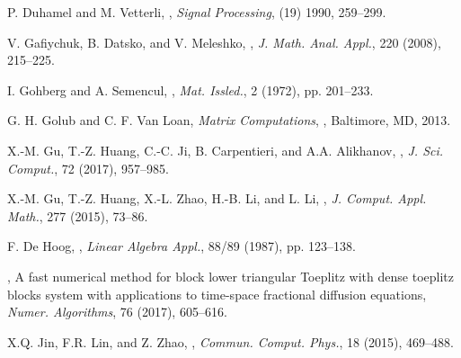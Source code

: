\documentclass{ecnumaster}
\begin{document}
\begin{thebibliography}{99}
\newblock P. Duhamel and M. Vetterli,
,
\newblock \emph{Signal Processing},
\newblock (19) 1990, 259--299.

\newblock V. Gafiychuk, B. Datsko, and V. Meleshko,
,
\newblock \emph{J. Math. Anal. Appl.}, 220 (2008), 215--225.

\newblock I. Gohberg and A. Semencul,
,
\newblock \emph{Mat. Issled.}, 2 (1972), pp. 201--233.

\newblock G. H. Golub and C. F. Van Loan,
\newblock \emph{Matrix Computations},
, Baltimore, MD, 2013.

\newblock X.-M. Gu, T.-Z. Huang, C.-C. Ji, B. Carpentieri, and A.A. Alikhanov,
,
\newblock \emph{J. Sci. Comput.}, 72 (2017), 957--985.


\newblock X.-M. Gu, T.-Z. Huang, X.-L. Zhao, H.-B. Li, and L. Li,
,
\newblock \emph{J. Comput. Appl. Math.}, 277 (2015), 73--86.

\newblock F. De Hoog,
,
\newblock \emph{Linear Algebra Appl.}, 88/89 (1987), pp. 123--138.

,
\newblock A fast numerical method for block lower triangular Toeplitz with dense toeplitz blocks system with applications to time-space fractional diffusion equations,
\newblock \emph{Numer. Algorithms}, 76 (2017), 605--616.

\newblock X.Q. Jin, F.R. Lin, and Z. Zhao,
,
\newblock \emph{Commun. Comput. Phys.}, 18 (2015), 469--488.


\end{thebibliography}
\end{document}
